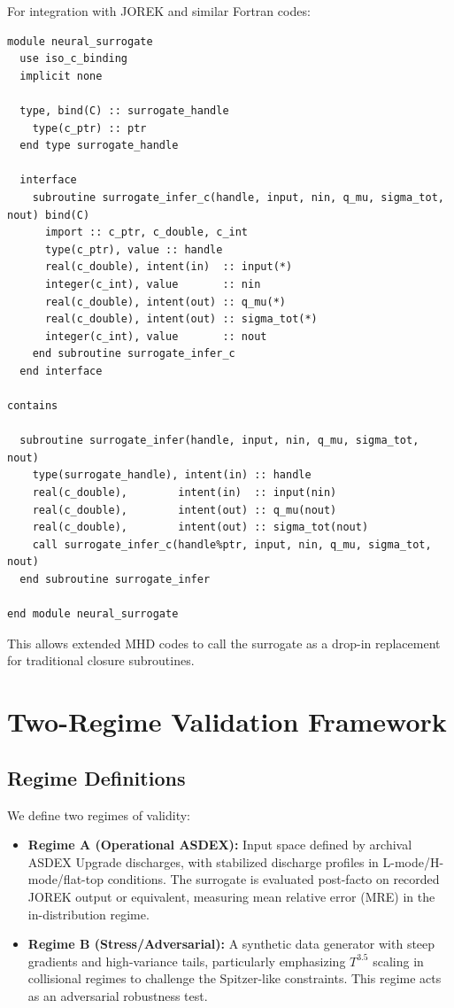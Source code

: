 \documentclass[11pt]{article}
\begin{document}
For integration with JOREK and similar Fortran codes:

\begin{lstlisting}[style=code]
module neural_surrogate
  use iso_c_binding
  implicit none

  type, bind(C) :: surrogate_handle
    type(c_ptr) :: ptr
  end type surrogate_handle

  interface
    subroutine surrogate_infer_c(handle, input, nin, q_mu, sigma_tot, nout) bind(C)
      import :: c_ptr, c_double, c_int
      type(c_ptr), value :: handle
      real(c_double), intent(in)  :: input(*)
      integer(c_int), value       :: nin
      real(c_double), intent(out) :: q_mu(*)
      real(c_double), intent(out) :: sigma_tot(*)
      integer(c_int), value       :: nout
    end subroutine surrogate_infer_c
  end interface

contains

  subroutine surrogate_infer(handle, input, nin, q_mu, sigma_tot, nout)
    type(surrogate_handle), intent(in) :: handle
    real(c_double),        intent(in)  :: input(nin)
    real(c_double),        intent(out) :: q_mu(nout)
    real(c_double),        intent(out) :: sigma_tot(nout)
    call surrogate_infer_c(handle%ptr, input, nin, q_mu, sigma_tot, nout)
  end subroutine surrogate_infer

end module neural_surrogate
\end{lstlisting}

This allows extended MHD codes to call the surrogate as a drop-in replacement for traditional closure subroutines.

\section{Two-Regime Validation Framework}

\subsection{Regime Definitions}

We define two regimes of validity:

\begin{itemize}
  \item \textbf{Regime A (Operational ASDEX):}  
  Input space defined by archival ASDEX Upgrade discharges, with stabilized discharge profiles in L-mode/H-mode/flat-top conditions. The surrogate is evaluated post-facto on recorded JOREK output or equivalent, measuring mean relative error (MRE) in the in-distribution regime.

  \item \textbf{Regime B (Stress/Adversarial):}  
  A synthetic data generator with steep gradients and high-variance tails, particularly emphasizing $T^{3.5}$ scaling in collisional regimes to challenge the Spitzer-like constraints. This regime acts as an adversarial robustness test.
\end{itemize}
\end{document}
